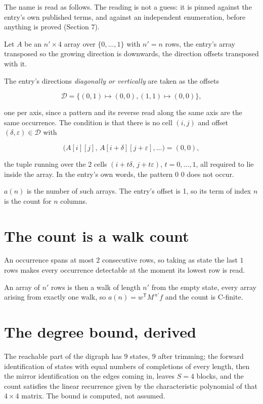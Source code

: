 \documentclass[11pt]{article}
\theoremstyle{definition}
\begin{document}
The name is read as follows. The reading is not a guess: it is pinned against the entry's own published terms, and against an independent enumeration, before anything is proved (Section 7).

Let $A$ be an $n' \times 4$ array over $\{0,\dots,1\}$ with $n' = n$ rows, the entry's array transposed so the growing direction is downwards, the direction offsets transposed with it.

The entry's directions {\itshape diagonally or vertically} are taken as the offsets

\[\mathcal{D} = \{(0,1)\mapsto(0,0), (1,1)\mapsto(0,0)\},\]

one per axis, since a pattern and its reverse read along the same axis are the same occurrence. The condition is that there is no cell $(i,j)$ and offset $(\delta,\varepsilon)\in\mathcal{D}$ with

\[\bigl(A[i][j],\,A[i{+}\delta][j{+}\varepsilon],\dots\bigr) = (0, 0),\]

the tuple running over the $2$ cells $(i+t\delta,\,j+t\varepsilon)$, $t = 0,\dots,1$, all required to lie inside the array. In the entry's own words, the pattern 0 0 does not occur.

$a(n)$ is the number of such arrays. The entry's offset is 1, so its term of index $n$ is the count for $n$ columns.

\section{The count is a walk count}

An occurrence spans at most $2$ consecutive rows, so taking as state the last $1$ rows makes every occurrence detectable at the moment its lowest row is read.

An array of $n'$ rows is then a walk of length $n'$ from the empty state, every array arising from exactly one walk, so $a(n) = w^{\mathsf T}M^{\,n'}f$ and the count is C-finite.

\section{The degree bound, derived}

The reachable part of the digraph has $9$ states, $9$ after trimming; the forward identification of states with equal numbers of completions of every length, then the mirror identification on the edges coming in, leaves $S = 4$ blocks, and the count satisfies the linear recurrence given by the characteristic polynomial of that $4\times4$ matrix. The bound is computed, not assumed.
\end{document}
